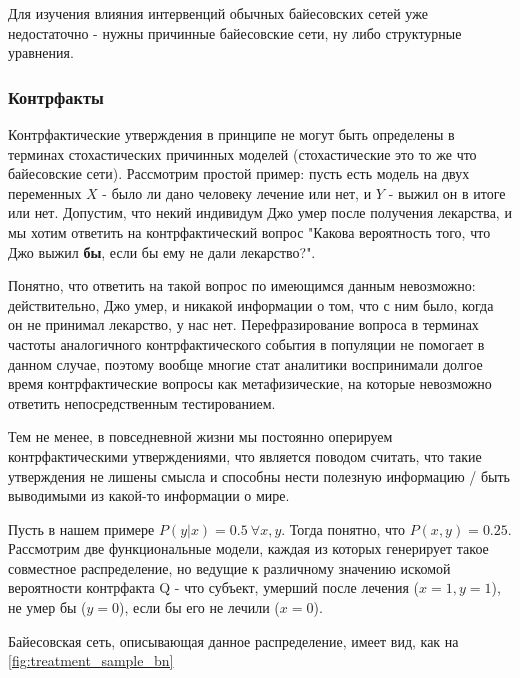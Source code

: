 \documentclass[fleqn]{article}
\begin{document}
Для изучения влияния интервенций обычных байесовских сетей уже недостаточно - нужны причинные байесовские сети, ну либо структурные уравнения.

\subsubsection*{Контрфакты}

Контрфактические утверждения в принципе не могут быть определены в терминах стохастических причинных моделей (стохастические это то же что байесовские сети). Рассмотрим простой пример: пусть есть модель на двух переменных $X$ - было ли дано человеку лечение или нет, и $Y$ - выжил он в итоге или нет. Допустим, что некий индивидум Джо умер после получения лекарства, и мы хотим ответить на контрфактический вопрос "Какова вероятность того, что Джо выжил \textbf{бы}, если бы ему не дали лекарство?".

Понятно, что ответить на такой вопрос по имеющимся данным невозможно: действительно, Джо умер, и никакой информации о том, что с ним было, когда он не принимал лекарство, у нас нет. Перефразирование вопроса в терминах частоты аналогичного контрфактического события в популяции не помогает в данном случае, поэтому вообще многие стат аналитики воспринимали долгое время контрфактические вопросы как метафизические, на которые невозможно ответить непосредственным тестированием.

Тем не менее, в повседневной жизни мы постоянно оперируем контрфактическими утверждениями, что является поводом считать, что такие утверждения не лишены смысла и способны нести полезную информацию / быть выводимыми из какой-то информации о мире.

Пусть в нашем примере $P(y|x) = 0.5 \ \forall x, y$. Тогда понятно, что $P(x,y) = 0.25$. Рассмотрим две функциональные модели, каждая из которых генерирует такое совместное распределение, но ведущие к различному значению искомой вероятности контрфакта Q - что субъект, умерший после лечения ($x=1, y=1$), не умер бы ($y = 0$), если бы его не лечили ($x=0$). 

Байесовская сеть, описывающая данное распределение, имеет вид, как на \ref{fig:treatment_sample_bn}
\end{document}
